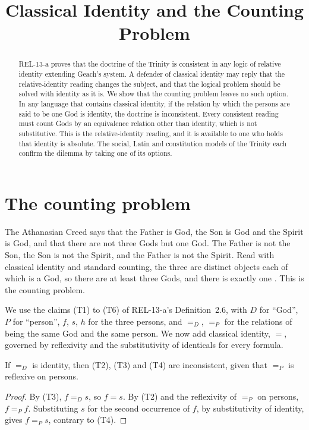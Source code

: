 \documentclass{situationist-preprint}
\title{Classical Identity and the Counting Problem}
\begin{document}
\maketitle

\begin{abstract}
REL-13-a proves that the doctrine of the Trinity is consistent in any logic of relative identity extending Geach's system. A defender of classical identity may reply that the relative-identity reading changes the subject, and that the logical problem should be solved with identity as it is. We show that the counting problem leaves no such option. In any language that contains classical identity, if the relation by which the persons are said to be one God is identity, the doctrine is inconsistent. Every consistent reading must count Gods by an equivalence relation other than identity, which is not substitutive. This is the relative-identity reading, and it is available to one who holds that identity is absolute. The social, Latin and constitution models of the Trinity each confirm the dilemma by taking one of its options.
\end{abstract}

\section{The counting problem}

The Athanasian Creed says that the Father is God, the Son is God and the Spirit is God, and that there are not three Gods but one God. The Father is not the Son, the Son is not the Spirit, and the Father is not the Spirit. Read with classical identity and standard counting, the three are distinct objects each of which is a God, so there are at least three Gods, and there is exactly one \citep{Cartwright1987}. This is the counting problem.

We use the claims (T1) to (T6) of REL-13-a's Definition~2.6, with $D$ for \enquote{God}, $P$ for \enquote{person}, $f$, $s$, $h$ for the three persons, and $=_D$, $=_P$ for the relations of being the same God and the same person. We now add classical identity, $=$, governed by reflexivity and the substitutivity of identicals for every formula.

\begin{proposition}\label{p:identity}
If $=_D$ is identity, then (T2), (T3) and (T4) are inconsistent, given that $=_P$ is reflexive on persons.
\end{proposition}

\begin{proof}
By (T3), $f =_D s$, so $f = s$. By (T2) and the reflexivity of $=_P$ on persons, $f =_P f$. Substituting $s$ for the second occurrence of $f$, by substitutivity of identity, gives $f =_P s$, contrary to (T4).
\end{proof}
\end{document}
